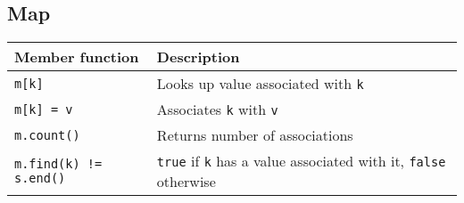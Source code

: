 \subsection{Map}

\begin{center}
  \begin{tabular}{ll}
    \textbf{Member function} & \textbf{Description} \\
    \toprule
    \verb'm[k]' & Looks up value associated with \verb'k' \\
    \verb'm[k] = v' & Associates \verb'k' with \verb'v' \\
    \verb'm.count()' & Returns number of associations \\
    \verb'm.find(k) != s.end()' & \verb'true' if \verb'k' has a value associated with it, \verb'false' otherwise \\
  \end{tabular}
\end{center}


